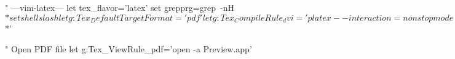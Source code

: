 " ---vim-latex---
let tex_flavor='latex'
set grepprg=grep\ -nH\ $*
set shellslash
let g:Tex_DefaultTargetFormat='pdf'
let g:Tex_CompileRule_dvi='platex --interaction=nonstopmode $*'

" Open PDF file
let g:Tex_ViewRule_pdf='open -a Preview.app'
